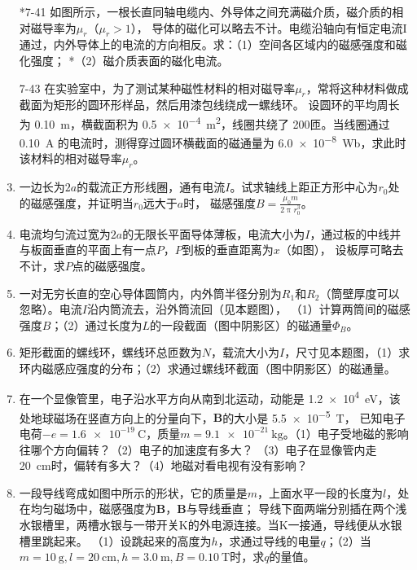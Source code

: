 \documentclass[UTF-8]{ctexart}
\makeatletter
\newcommand{\mlabel}[2]{#2\def\@currentlabel{#2}\label{#1}}
\newcommand{\csi}[2]{ \SI{#1}{#2}}
\makeatother
\begin{document}
\begin{enumerate}
    \item[\mlabel{itm:41}{*7-41}] 如图所示，一根长直同轴电缆内、外导体之间充满磁介质，磁介质的相对磁导率为\(\mu_r\)（\(\mu_r>1\)），
        导体的磁化可以略去不计。电缆沿轴向有恒定电流I通过，内外导体上的电流的方向相反。求：（1）空间各区域内的磁感强度和磁化强度；
        *\negthickspace（2）磁介质表面的磁化电流。
        
    \item[7-43] 在实验室中，为了测试某种磁性材料的相对磁导率\(\mu_r\)，常将这种材料做成截面为矩形的圆环形样品，然后用漆包线绕成一螺线环。
        设圆环的平均周长为\csi{0.10}{\m}，横截面积为\csi{0.5e-4}{\square\m}，线圈共绕了\csi{200}{}匝。当线圈通过\csi{0.10}{\A}
        的电流时，测得穿过圆环横截面的磁通量为\csi{6.0e-8}{\weber}，求此时该材料的相对磁导率\(\mu_r\)。
    
    \item 一边长为\(2a\)的载流正方形线圈，通有电流\(I\)。试求轴线上距正方形中心为\(r_0\)处的磁感强度，并证明当\(r_0\)远大于\(a\)时，
        磁感强度\(B=\frac{\mu_0m}{2\uppi r_0^3}\)。

    \item 电流均匀流过宽为\(2a\)的无限长平面导体薄板，电流大小为\(I\)，通过板的中线并与板面垂直的平面上有一点\(P\)，\(P\)到板的垂直距离为\(x\)（如图），
        设板厚可略去不计，求\(P\)点的磁感强度。

    \item 一对无穷长直的空心导体圆筒内，内外筒半径分别为\(R_1\)和\(R_2\)（筒壁厚度可以忽略）。电流\(I\)沿内筒流去，沿外筒流回（见本题图），
        （1）计算两筒间的磁感强度\(B\)；（2）通过长度为\(L\)的一段截面（图中阴影区）的磁通量\(\varPhi_B\)。

    \item 矩形截面的螺线环，螺线环总匝数为\(N\)，载流大小为\(I\)，尺寸见本题图，（1）求环内磁感应强度的分布；（2）求通过螺线环截面（图中阴影区）的磁通量。 

    \item 在一个显像管里，电子沿水平方向从南到北运动，动能是\csi{1.2e4}{\eV}，该处地球磁场在竖直方向上的分量向下，\(\bm{B}\)的大小是\csi{5.5e-5}{\tesla}，
        已知电子电荷\(-e=\csi{1.6e-19}{\coulomb}\)，质量\(m=\csi{9.1e-21}{\kg}\)。（1）电子受地磁的影响往哪个方向偏转？（2）电子的加速度有多大？
        （3）电子在显像管内走\csi{20}{\cm}时，偏转有多大？（4）地磁对看电视有没有影响？

    \item 一段导线弯成如图中所示的形状，它的质量是\(m\)，上面水平一段的长度为\(l\)，处在均匀磁场中，磁感强度为\(\bm{B}\)，\(\bm{B}\)与导线垂直；
        导线下面两端分别插在两个浅水银槽里，两槽水银与一带开关K的外电源连接。当K一接通，导线便从水银槽里跳起来。
        （1）设跳起来的高度为\(h\)，求通过导线的电量\(q\)；（2）当\(m=\csi{10}{\g},l=\csi{20}{\cm},h=\csi{3.0}{\m},B=\csi{0.10}{\tesla}\)时，求\(q\)的量值。


\end{enumerate}
\end{document}
